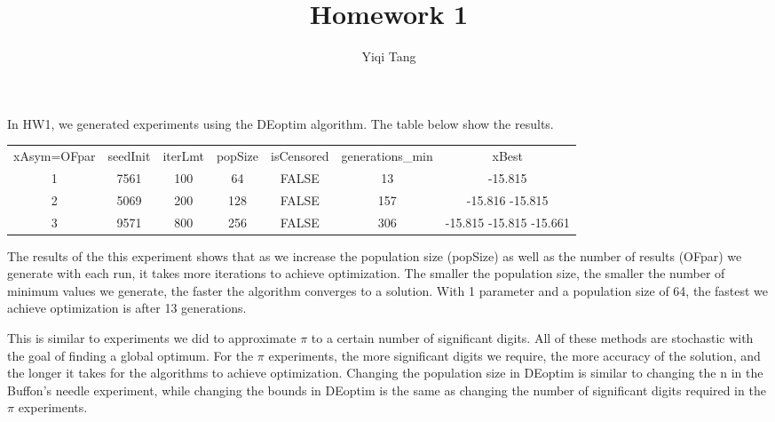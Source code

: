 \documentclass[11pt, oneside]{article}   	%
\title{Homework 1}
\author{Yiqi Tang}
\begin{document}
\maketitle
   
\vspace*{3ex}
\noindent
In HW1, we generated experiments using the DEoptim algorithm. The table below show the results. 

\begin{center}
\begin{tabular}{ c c c c c c c }
xAsym=OFpar & seedInit & iterLmt & popSize & isCensored & generations\_min & xBest \\ 
1 & 7561 & 100 & 64 & FALSE & 13 & -15.815 \\  
2 & 5069 & 200 & 128 & FALSE & 157 & -15.816 -15.815 \\
3 & 9571 & 800 & 256 & FALSE & 306 & -15.815 -15.815 -15.661 \\ 
\end{tabular}
\end{center}
	
\vspace*{3ex}\noindent
The results of the this experiment shows that as we increase the population size (popSize) as well as the number of results (OFpar) we generate with each run, it takes more iterations to achieve optimization. The smaller the population size, the smaller the number of minimum values we generate, the faster the algorithm converges to a solution. With 1 parameter and a population size of 64, the fastest we achieve optimization is after 13 generations. 

\vspace*{3ex}\noindent
This is similar to experiments we did to approximate $\pi$ to a certain number of significant digits. All of these methods are stochastic with the goal of finding a global optimum. For the $\pi$ experiments, the more significant digits we require, the more accuracy of the solution, and the longer it takes for the algorithms to achieve optimization. Changing the population size in DEoptim is similar to changing the n in the Buffon's needle experiment, while changing the bounds in DEoptim is the same as changing the number of significant digits required in the $\pi$ experiments. 
\end{document}

